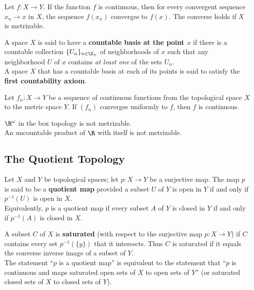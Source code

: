 \begin{theorem}
Let $f\colon X\rightarrow Y$. If the function $f$ is continuous, then for every convergent sequence $x_n \rightarrow x$ in $X$, the sequence $f(x_n)$ converges to $f(x)$. 
The converse holds if $X$ is metrizable.
\end{theorem}

\begin{definition}
A space $X$ is said to have a \textbf{countable basis at the point $x$} if there is a countable collection $\{ U_n \}_{n \in \Z_+}$ of neighborhoods of $x$
such that any neighborhood $U$ of $x$ contains \textit{at least one} of the sets $U_n$. \\

A space $X$ that has a countable basis at each of its points is said to satisfy the \textbf{first countability axiom}.
\end{definition}

\begin{theorem}
Let $f_n \colon X \rightarrow Y$ be a sequence of continuous functions from the topological space $X$ to the metric space $Y$. If $(f_n)$ converges uniformly to $f$, then
$f$ is continuous.
\end{theorem}

\begin{eg}
$\R^\omega$ in the box topology is not metrizable. \\

An uncountable product of $\R$ with itself is not metrizable.
\end{eg}

\subsection{The Quotient Topology}

\begin{definition}
Let $X$ and $Y$ be topological spaces; let $p \colon X \rightarrow Y$ be a surjective map. The map $p$ is said to be a \textbf{quotient map} 
provided a subset $U$ of $Y$ is open in $Y$ if and only if $p^{-1}(U)$ is open in $X$. \\

Equivalently, $p$ is a quotient map if every subset $A$ of $Y$ is closed in $Y$ if and only if $p^{-1}(A)$ is closed in $X$.
\end{definition}

\begin{definition}
A subset $C$ of $X$ is \textbf{saturated} (with respect to the surjective map $p\colon X \rightarrow Y$) if $C$ contains every set $p^{-1}(\{ y \})$ that it intersects.
Thus $C$ is saturated if it equals the converse inverse image of a subset of $Y$. \\

The statement ``$p$ is a quotient map'' is equivalent to the statement that ``$p$ is continuous and maps saturated open sets of $X$ to open sets of $Y$'' (or 
saturated closed sets of $X$ to closed sets of $Y$).
\end{definition}

